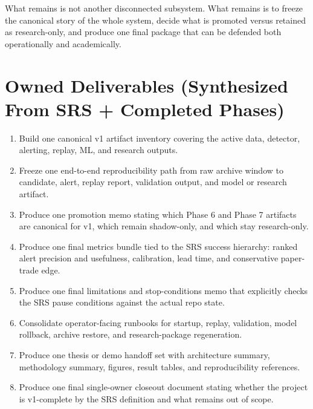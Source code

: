 \documentclass{article}
\begin{document}
What remains is not another disconnected subsystem. What remains is to freeze the canonical story of the whole system, decide what is promoted versus retained as research-only, and produce one final package that can be defended both operationally and academically.

\section*{Owned Deliverables (Synthesized From SRS + Completed Phases)}
\begin{enumerate}
\item Build one canonical v1 artifact inventory covering the active data, detector, alerting, replay, ML, and research outputs.
\item Freeze one end-to-end reproducibility path from raw archive window to candidate, alert, replay report, validation output, and model or research artifact.
\item Produce one promotion memo stating which Phase 6 and Phase 7 artifacts are canonical for v1, which remain shadow-only, and which stay research-only.
\item Produce one final metrics bundle tied to the SRS success hierarchy: ranked alert precision and usefulness, calibration, lead time, and conservative paper-trade edge.
\item Produce one final limitations and stop-conditions memo that explicitly checks the SRS pause conditions against the actual repo state.
\item Consolidate operator-facing runbooks for startup, replay, validation, model rollback, archive restore, and research-package regeneration.
\item Produce one thesis or demo handoff set with architecture summary, methodology summary, figures, result tables, and reproducibility references.
\item Produce one final single-owner closeout document stating whether the project is v1-complete by the SRS definition and what remains out of scope.
\end{enumerate}
\end{document}

